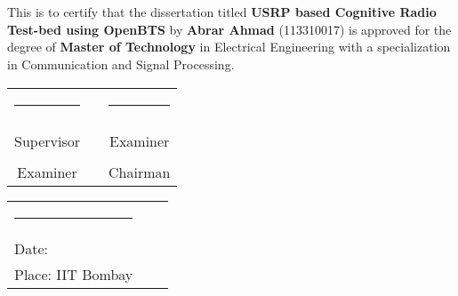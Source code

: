 \chapter*{}
\thispagestyle{empty}

This is to certify that the dissertation titled \textbf{USRP based Cognitive
Radio Test-bed using OpenBTS} by \textbf{Abrar Ahmad} (113310017) is approved
for the degree of \textbf{Master of Technology} in Electrical Engineering with
a specialization in Communication and Signal Processing.

\vspace{2.5cm}

\begin{center}
\begin{tabular}{ccc}
\rule{60mm}{0pt}        & \rule{10mm}{0pt}       & \rule{60mm}{0pt} \\
\dotfill                &                        & \dotfill \\
Supervisor              &                        & Examiner \vspace{2cm} \\
\dotfill                &                        & \dotfill \\
Examiner       &                        & Chairman \vspace{2cm} \\
\end{tabular}    
\end{center}

\vspace{5mm}
\begin{tabular}{lll}
\rule{40mm}{0pt}        & \rule{50mm}{0pt}       & \rule{60mm}{0pt} \\
Date:\dotfill           &                        & \\
Place: IIT Bombay       &                        & \\
\end{tabular}
